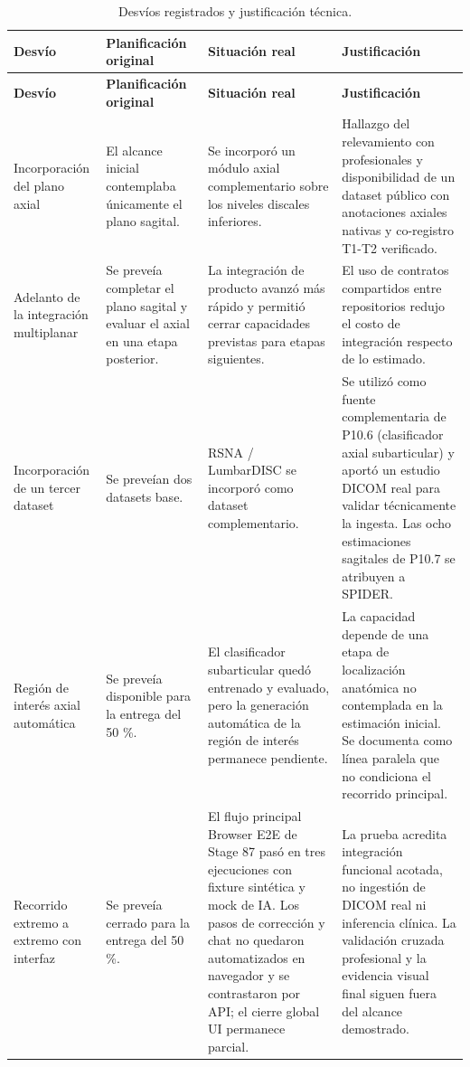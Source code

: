 \begingroup
\scriptsize
\setlength{\tabcolsep}{3pt}
\renewcommand{\arraystretch}{1.16}
\begin{longtable}{|>{\raggedright\arraybackslash}p{}|>{\raggedright\arraybackslash}p{}|>{\raggedright\arraybackslash}p{}|>{\raggedright\arraybackslash}p{}|}
\caption{Desvíos registrados y justificación técnica.}\label{tab:anexo-a-desvios}\\
\hline
\textbf{Desvío} & \textbf{Planificación original} & \textbf{Situación real} & \textbf{Justificación} \\
\hline
\endfirsthead
\hline
\textbf{Desvío} & \textbf{Planificación original} & \textbf{Situación real} & \textbf{Justificación} \\
\hline
\endhead
Incorporación del plano axial & El alcance inicial contemplaba únicamente el plano sagital. & Se incorporó un módulo axial complementario sobre los niveles discales inferiores. & Hallazgo del relevamiento con profesionales y disponibilidad de un dataset público con anotaciones axiales nativas y co-registro T1-T2 verificado. \\
\hline
Adelanto de la integración multiplanar & Se preveía completar el plano sagital y evaluar el axial en una etapa posterior. & La integración de producto avanzó más rápido y permitió cerrar capacidades previstas para etapas siguientes. & El uso de contratos compartidos entre repositorios redujo el costo de integración respecto de lo estimado. \\
\hline
Incorporación de un tercer dataset & Se preveían dos datasets base. & RSNA / LumbarDISC se incorporó como dataset complementario. & Se utilizó como fuente complementaria de P10.6 (clasificador axial subarticular) y aportó un estudio DICOM real para validar técnicamente la ingesta. Las ocho estimaciones sagitales de P10.7 se atribuyen a SPIDER. \\
\hline
Región de interés axial automática & Se preveía disponible para la entrega del 50 \%. & El clasificador subarticular quedó entrenado y evaluado, pero la generación automática de la región de interés permanece pendiente. & La capacidad depende de una etapa de localización anatómica no contemplada en la estimación inicial. Se documenta como línea paralela que no condiciona el recorrido principal. \\
\hline
Recorrido extremo a extremo con interfaz & Se preveía cerrado para la entrega del 50 \%. & El flujo principal Browser E2E de Stage 87 pasó en tres ejecuciones con fixture sintética y mock de IA. Los pasos de corrección y chat no quedaron automatizados en navegador y se contrastaron por API; el cierre global UI permanece parcial. & La prueba acredita integración funcional acotada, no ingestión de DICOM real ni inferencia clínica. La validación cruzada profesional y la evidencia visual final siguen fuera del alcance demostrado. \\
\hline
\end{longtable}
\endgroup
